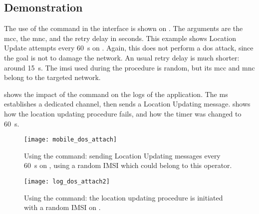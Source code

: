       \subsection{Demonstration}

      The use of the  command in the 
      interface is shown on . The arguments
      are the \gls{mcc}, the \gls{mnc}, and the retry delay in seconds.
      This example shows Location Update attempts every \SI{60}{\second}
      on . Again, this does not perform a \gls{dos} attack,
      since the goal is not to damage the network. An usual retry delay
      is much shorter: around \SI{15}{\second}. The \gls{imsi} used during
      the procedure is random, but its \gls{mcc} and \gls{mnc} belong to
      the targeted network. 

       shows the impact of the command on the
      logs of the  application. The \gls{ms} establishes a
      dedicated channel, then sends a Location Updating message.
       shows how the location updating
      procedure fails, and how the timer was changed to
      \SI{60}{\second}.

      \begin{figure}
        \centering
        \texttt{[image: mobile\_dos\_attach]}
        \caption{Using the  command: sending Location
        Updating messages every \SI{60}{\second} on , using
      a random IMSI which could belong to this operator.}
        \label{fig:mobile_dos_attach}
      \end{figure}

      \iffalse
      \begin{figure}
        \centering
        \texttt{[image: log\_dos\_attach]}
        \caption{Using the \prog{dos attach} to send a Location Updating
          Request with a random IMSI to \comp{Netcom} using Wireshark.}
        \label{fig:log_dos_attach}
      \end{figure}
      \fi

      \begin{figure}
        \centering
        \texttt{[image: log\_dos\_attach2]}
        \caption{Using the  command: the location
        updating procedure is initiated with a random IMSI on
      .}
        \label{fig:log_dos_attach2}
      \end{figure}

